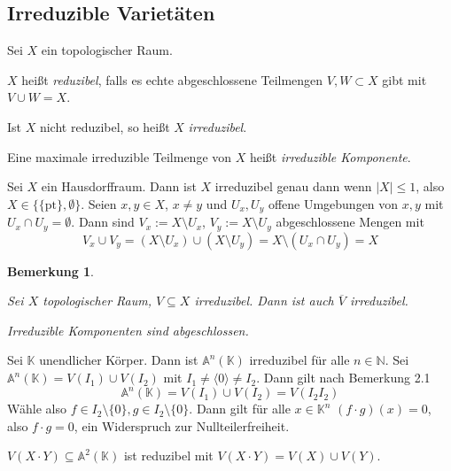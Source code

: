 \documentclass[11pt]{book}
\newtheorem{remark}[theorem]{Bemerkung}
\theoremstyle{nonumberbreak}
\newenvironment{defin}[1][]{\ifthenelse{\equal{#1}{}}{\definition}{\definition[#1]}\rm}{\enddefinition}
\newenvironment{pr}[1][]{\ifthenelse{\equal{#1}{}}{\proof}{\proof[#1]}\rm}{\endproof}
\newenvironment{ex}[1][]{\ifthenelse{\equal{#1}{}}{\example}{\example[#1]}\rm}{\endexample}
\begin{document}
\begin{spacing}{1.3}
\renewcommand*\thesection{§ \arabic{section}\quad}
\section{Irreduzible Varietäten} %
\renewcommand*\thesection{\arabic{section}}

\begin{defin} %
 Sei $X$ ein topologischer Raum.
 \begin{compactenum}
 \item $X$ heißt \textit{reduzibel}, falls es echte abgeschlossene Teilmengen $V,W \subset X$ gibt mit $V \cup W = X$.
 \item Ist $X$ nicht reduzibel, so heißt $X$ \textit{irreduzibel}.
 \item Eine maximale irreduzible Teilmenge von $X$ heißt \textit{irreduzible Komponente}.
 \end{compactenum}
 \end{defin}
 
\begin{ex} %
 Sei $X$ ein Hausdorffraum. Dann ist $X$ irreduzibel genau dann wenn $\vert X \vert \leqslant 1$, also $X \in \{\{\textrm{pt}\}, \emptyset\}$.
\begin{pr}
 Seien $x,y \in X$, $x \neq y$ und $U_x, U_y$ offene Umgebungen von $x,y$ mit $U_x \cap U_y = \emptyset$. Dann sind $V_x :=X\setminus U_x$, $V_y:=X \setminus U_y$ abgeschlossene Mengen mit
 $$V_x \cup V_y = (X \setminus U_x) \cup (X \setminus U_y)= X\setminus (U_x \cap U_y) =X$$
\end{pr}
\end{ex}

\begin{remark} %
\begin{compactenum}
\item Sei $X$ topologischer Raum, $V \subseteq X$ irreduzibel. Dann ist auch $\overline{V}$ irreduzibel.
\item Irreduzible Komponenten sind abgeschlossen.
\end{compactenum}
\end{remark}

\begin{ex} %
\begin{compactenum}
\item Sei $\mathbb{K}$ unendlicher Körper. Dann ist $\mathbb{A}^n(\mathbb{K})$ irreduzibel für alle $n \in \mathbb{N}$.
\begin{pr}
Sei $\mathbb{A}^n(\mathbb{K})=V(I_1) \cup V(I_2)$ mit $I_1 \neq \langle 0 \rangle \neq I_2$. Dann gilt nach Bemerkung 2.1
$$\mathbb{A}^n(\mathbb{K})=V(I_1) \cup V(I_2) = V(I_2 I_2)$$
Wähle also $f \in I_2 \setminus \{0\}, g \in I_2 \setminus \{0\}$. Dann gilt für alle $x \in \mathbb{K}^n$ $(f\cdot g)(x)=0$, also $f\cdot g =0$, ein Widerspruch zur Nullteilerfreiheit.
\item $V(X\cdot Y)\subseteq \mathbb{A}^2(\mathbb{K})$ ist reduzibel mit $V(X\cdot Y)=V(X)\cup V(Y)$.
\end{pr}
\end{compactenum}
\end{ex}


\end{spacing}
\end{document}
